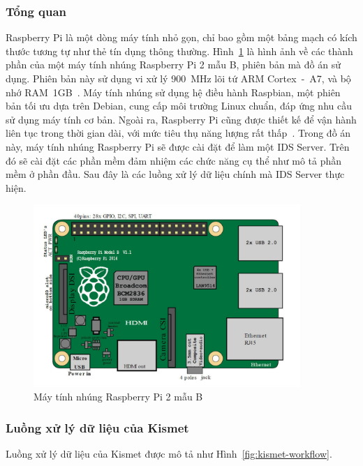 \subsubsection{Tổng quan}

Raspberry Pi là một dòng máy tính nhỏ gọn, chỉ bao gồm một bảng mạch có kích thước tương tự như thẻ tín dụng thông thường. 
Hình~\ref{fig:Raspberry-Pi-2-Model-B-1GB} là hình ảnh về các thành phần của một máy tính nhúng Raspberry Pi 2 mẫu B, phiên bản mà đồ án sử dụng. Phiên bản này sử dụng vi xử lý 900~MHz lõi tứ ARM Cortex~-~A7, và bộ nhớ RAM~1GB~\cite{rasberry2017raspberry}. Máy tính nhúng sử dụng hệ điều hành Raspbian, một phiên bản tối ưu dựa trên Debian, cung cấp môi trường Linux chuẩn, đáp ứng nhu cầu sử dụng máy tính cơ bản. Ngoài ra, Raspberry Pi cũng được thiết kế để vận hành liên tục trong thời gian dài, với mức tiêu thụ năng lượng rất thấp~\cite{wikipedia2017raspberry}. Trong đồ án này, máy tính nhúng Raspberry Pi sẽ được cài đặt để làm một IDS Server. Trên đó sẽ cài đặt các phần mềm đảm nhiệm các chức năng cụ thể như mô tả phần mềm ở phần đầu. Sau đây là các luồng xử lý dữ liệu chính mà IDS Server thực hiện.

\begin{figure}[H]
    \centering
    \includegraphics[width=0.9\textwidth]{Raspberry-Pi-2-Model-B-1GB}
    \caption{
        \label{fig:Raspberry-Pi-2-Model-B-1GB}
        Máy tính nhúng Raspberry Pi 2 mẫu B}
\end{figure}

\subsubsection{Luồng xử lý dữ liệu của Kismet}
Luồng xử lý dữ liệu của Kismet được mô tả như Hình~\ref{fig:kismet-workflow}.

